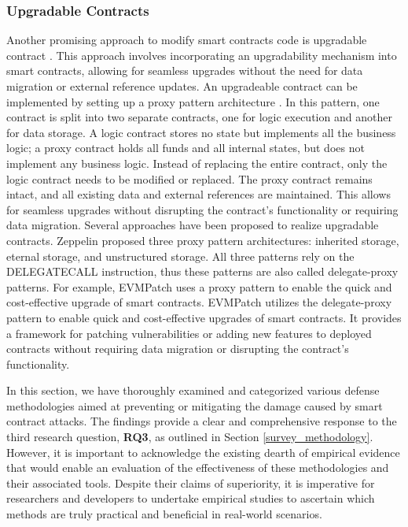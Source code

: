 \documentclass[manuscript,screen]{acmart}
\begin{document}
\subsubsection{Upgradable Contracts}
Another promising approach to modify smart contracts code is upgradable contract \cite{josselinfeist2, ZhengGHG21, ProxyPatterns}. This approach involves incorporating an upgradability mechanism into smart contracts, allowing for seamless upgrades without the need for data migration or external reference updates. An upgradeable contract can be implemented by setting up a proxy pattern architecture \cite{ZhengGHG21}.
In this pattern, one contract is split into two separate contracts, one for logic execution and another for data storage. A logic contract stores no state but implements all the business logic; a proxy contract holds all funds and all internal states, but does not implement any business logic. 
Instead of replacing the entire contract, only the logic contract needs to be modified or replaced. The proxy contract remains intact, and all existing data and external references are maintained. This allows for seamless upgrades without disrupting the contract's functionality or requiring data migration. Several approaches have been proposed to realize upgradable contracts.
Zeppelin \cite{ProxyPatterns} proposed three proxy pattern architectures: inherited storage, eternal storage, and unstructured storage. All three patterns rely on the DELEGATECALL instruction, thus these patterns are also called delegate-proxy patterns. 
For example, EVMPatch \cite{RodlerLKD21} uses a proxy pattern to enable the quick and cost-effective upgrade of smart contracts. 
EVMPatch\cite{RodlerLKD21} utilizes the delegate-proxy pattern to enable quick and cost-effective upgrades of smart contracts. It provides a framework for patching vulnerabilities or adding new features to deployed contracts without requiring data migration or disrupting the contract's functionality.


In this section, we have thoroughly examined and categorized various defense methodologies aimed at preventing or mitigating the damage caused by smart contract attacks. The findings provide a clear and comprehensive response to the third research question, \textbf{RQ3}, as outlined in Section \ref{survey_methodology}. However, it is important to acknowledge the existing dearth of empirical evidence that would enable an evaluation of the effectiveness of these methodologies and their associated tools. Despite their claims of superiority, it is imperative for researchers and developers to undertake empirical studies to ascertain which methods are truly practical and beneficial in real-world scenarios.
\end{document}
